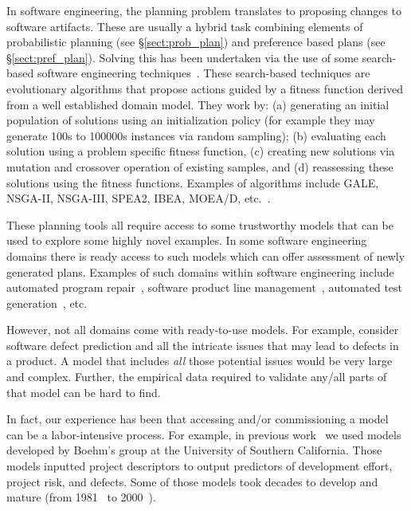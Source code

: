 \documentclass[10pt,journal,compsoc]{IEEEtran}
\newcommand{\tion}[1]{\S\ref{sect:#1}}
\begin{document}
In software engineering, the planning problem translates to proposing changes to software artifacts. These are usually a hybrid task combining elements of probabilistic planning (see \tion{prob_plan}) and preference based plans (see \tion{pref_plan}). Solving this has been undertaken via the use of some search-based software engineering techniques~\cite{Harman2009, Harman2011}. These search-based techniques are evolutionary algorithms that propose actions guided by a fitness function derived from a well established domain model. They work by: (a) generating an initial population of solutions using an initialization policy (for example they may generate 100s to 100000s instances via random sampling); (b) evaluating each solution using a problem specific fitness function, (c) creating new solutions via mutation and crossover operation of existing samples, and (d) reassessing these solutions using the fitness functions. Examples of algorithms include GALE, NSGA-II, NSGA-III, SPEA2, IBEA, MOEA/D, etc.~\cite{krall2015gale,deb00a,zit02,zit04, deb14,Cui2005a,zhang07:TEC}. 
 
These planning tools all require access to some trustworthy models that can be used to explore some highly novel examples. In some software engineering domains there is ready access to such models which can offer assessment of newly generated plans. Examples of such domains within software engineering include automated program repair~\cite{Weimer2009, Forrest2009, Goues12, Schulte2010, LeGoues2015}, software product line management~\cite{clements2002software, sayyad13, metzger14, henard15}, automated test generation~\cite{me09m,andrews07,andrews10}, etc.  

However, not all domains come with ready-to-use models. For example, consider software defect prediction and all the intricate issues that may lead to defects in a product. A model that includes {\em all} those potential issues would be very large and complex. Further, the empirical data required to validate any/all parts of that model can be hard to find.


In fact, our experience has been that accessing and/or commissioning a model can be a labor-intensive process.
For  example, in previous work~\cite{me07f} we used models developed by Boehm's group at the University of Southern California.
Those models inputted project descriptors to output predictors of development effort, project risk, and defects.
Some of those models took decades to develop and mature (from 1981~\cite{boehm81} to 2000~\cite{boehm00b}). 
\end{document}
